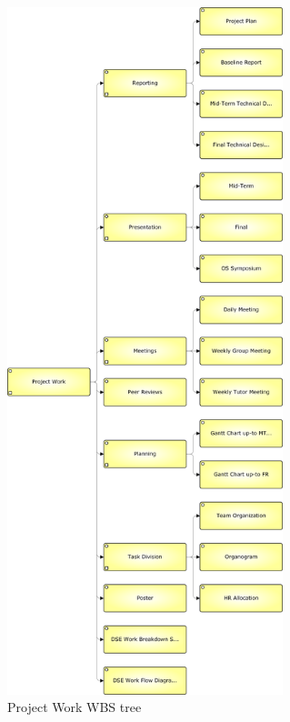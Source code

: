 \documentclass[a4paper]{report}
\begin{document}
\begin{figure}
\label{fig:WBSPW}
\centering
\includegraphics[height=20cm]{Figures/WBS_PW.png}

\caption{Project Work WBS tree}
\end{figure}
\end{document}

